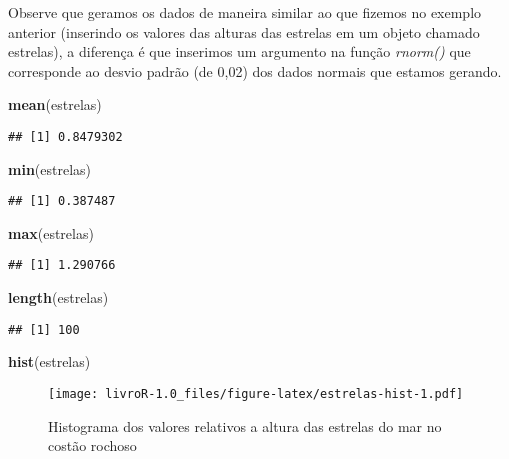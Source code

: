 \documentclass[]{book}
\newenvironment{Shaded}{\begin{snugshade}}{\end{snugshade}}
\newcommand{\KeywordTok}[1]{\textcolor[rgb]{0.13,0.29,0.53}{\textbf{#1}}}
\newcommand{\NormalTok}[1]{#1}
\begin{document}
Observe que geramos os dados de maneira similar ao que fizemos no exemplo anterior (inserindo os valores das alturas das estrelas em um objeto chamado estrelas), a diferença é que inserimos um argumento na função \emph{rnorm()} que corresponde ao desvio padrão (de 0,02) dos dados normais que estamos gerando.

\begin{Shaded}
\begin{Highlighting}[]
\KeywordTok{mean}\NormalTok{(estrelas)}
\end{Highlighting}
\end{Shaded}

\begin{verbatim}
## [1] 0.8479302
\end{verbatim}

\begin{Shaded}
\begin{Highlighting}[]
\KeywordTok{min}\NormalTok{(estrelas)}
\end{Highlighting}
\end{Shaded}

\begin{verbatim}
## [1] 0.387487
\end{verbatim}

\begin{Shaded}
\begin{Highlighting}[]
\KeywordTok{max}\NormalTok{(estrelas)}
\end{Highlighting}
\end{Shaded}

\begin{verbatim}
## [1] 1.290766
\end{verbatim}

\begin{Shaded}
\begin{Highlighting}[]
\KeywordTok{length}\NormalTok{(estrelas)}
\end{Highlighting}
\end{Shaded}

\begin{verbatim}
## [1] 100
\end{verbatim}

\begin{Shaded}
\begin{Highlighting}[]
\KeywordTok{hist}\NormalTok{(estrelas)}
\end{Highlighting}
\end{Shaded}

\begin{figure}
\centering
\texttt{[image: livroR-1.0\_files/figure-latex/estrelas-hist-1.pdf]}
\caption{\label{fig:estrelas-hist}Histograma dos valores relativos a altura das estrelas do mar no costão rochoso}
\end{figure}
\end{document}
